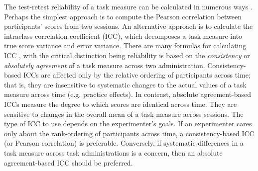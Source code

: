 \documentclass[a4paper,notitlepage,12pt]{article}
\begin{document}
The test-retest reliability of a task measure can be calculated in numerous ways \cite{Parsons2019-jw}. Perhaps the simplest approach is to compute the Pearson correlation between participants' scores from two sessions. An alternative approach is to calculate the intraclass correlation coefficient (ICC), which decomposes a task measure into true score variance and error variance. There are many formulas for calculating ICC \cite{Koo2016-fz}, with the critical distinction being reliability is based on the \textit{consistency} or \textit{absolutely agreement} of a task measure across two administration. Consistency-based ICCs are affected only by the relative ordering of participants across time; that is, they are insensitive to systematic changes to the actual values of a task measure across time (e.g. practice effects). In contrast, absolute agreement-based ICCs measure the degree to which scores are identical across time. They are sensitive to changes in the overall mean of a task measure across sessions. The type of ICC to use depends on the experimenter's goals. If an experimenter cares only about the rank-ordering of participants across time, a consistency-based ICC (or Pearson correlation) is preferable. Conversely, if systematic differences in a task measure across task administrations is a concern, then an absolute agreement-based ICC should be preferred. 
\end{document}
